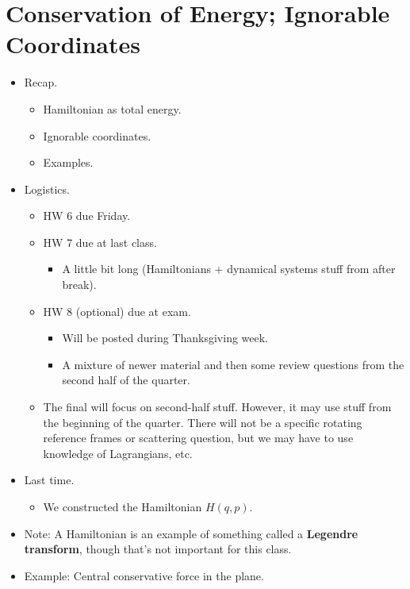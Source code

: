 \documentclass[../notes.tex]{subfiles}
\begin{document}
\section{Conservation of Energy; Ignorable Coordinates}
\begin{itemize}
    \item {}Recap.
    \begin{itemize}
        \item Hamiltonian as total energy.
        \item Ignorable coordinates.
        \item Examples.
    \end{itemize}
    \item Logistics.
    \begin{itemize}
        \item HW 6 due Friday.
        \item HW 7 due at last class.
        \begin{itemize}
            \item A little bit long (Hamiltonians + dynamical systems stuff from after break).
        \end{itemize}
        \item HW 8 (optional) due at exam.
        \begin{itemize}
            \item Will be posted during Thanksgiving week.
            \item A mixture of newer material and then some review questions from the second half of the quarter.
        \end{itemize}
        \item The final will focus on second-half stuff. However, it may use stuff from the beginning of the quarter. There will not be a specific rotating reference frames or scattering question, but we may have to use knowledge of Lagrangians, etc.
    \end{itemize}
    \item Last time.
    \begin{itemize}
        \item We constructed the Hamiltonian $H(q,p)$.
    \end{itemize}
    \item Note: A Hamiltonian is an example of something called a \textbf{Legendre transform}, though that's not important for this class.
    \item Example: Central conservative force in the plane.
    \begin{itemize}

\end{itemize}
\end{itemize}
\end{document}
